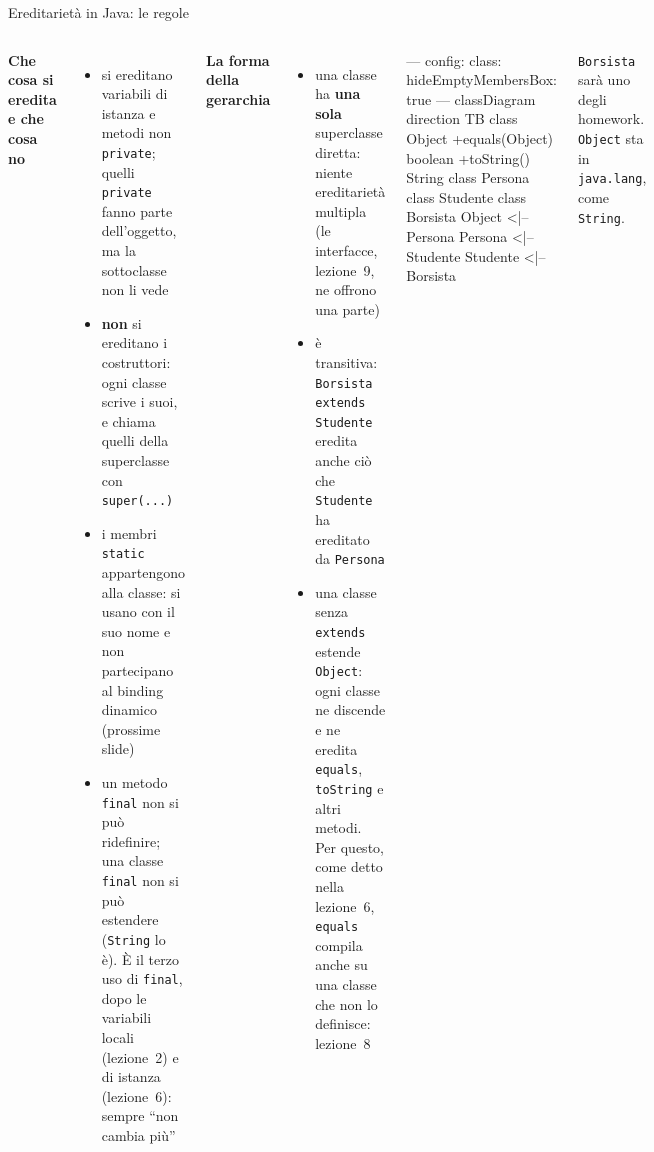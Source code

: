 \documentclass[10pt,aspectratio=169]{beamer}
\begin{document}
\begin{frame}[fragile]{Ereditarietà in Java: le regole}
\begin{columns}[T]
\footnotesize
\textbf{Che cosa si eredita e che cosa no}
\begin{itemize}\itemsep=2pt
    \item si ereditano variabili di istanza e metodi non \texttt{private}; quelli \texttt{private} fanno parte dell'oggetto, ma la sottoclasse non li vede
    \item \textbf{non} si ereditano i costruttori: ogni classe scrive i suoi, e chiama quelli della superclasse con \texttt{super(...)}
    \item i membri \texttt{static} appartengono alla classe: si usano con il suo nome e non partecipano al binding dinamico (prossime slide)
    \item un metodo \texttt{final} non si può ridefinire; una classe \texttt{final} non si può estendere (\texttt{String} lo è). È il terzo uso di \texttt{final}, dopo le variabili locali (lezione~2) e di istanza (lezione~6): sempre ``non cambia più''
\end{itemize}
\textbf{La forma della gerarchia}
\begin{itemize}\itemsep=2pt
    \item una classe ha \textbf{una sola} superclasse diretta: niente ereditarietà multipla (le interfacce, lezione~9, ne offrono una parte)
    \item è transitiva: \texttt{Borsista extends Studente} eredita anche ciò che \texttt{Studente} ha ereditato da \texttt{Persona}
    \item una classe senza \texttt{extends} estende \texttt{Object}: ogni classe ne discende e ne eredita \texttt{equals}, \texttt{toString} e altri metodi. Per questo, come detto nella lezione~6, \texttt{equals} compila anche su una classe che non lo definisce: lezione~8
\end{itemize}

\begin{mermaid}
---
config:
  class:
    hideEmptyMembersBox: true
---
classDiagram
  direction TB
  class Object {
    +equals(Object) boolean
    +toString() String
  }
  class Persona
  class Studente
  class Borsista
  Object <|-- Persona
  Persona <|-- Studente
  Studente <|-- Borsista
\end{mermaid}
\footnotesize
\texttt{Borsista} sarà uno degli homework. \texttt{Object} sta in \texttt{java.lang}, come \texttt{String}.
\end{columns}
\end{frame}
\end{document}
